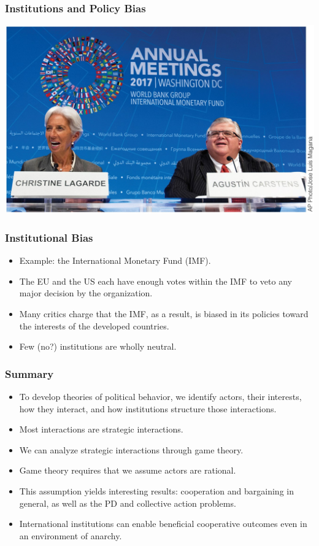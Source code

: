 \documentclass[handout]{beamer}
\begin{document}
\begin{frame} 
	\frametitle{\LARGE{Institutions and Policy Bias}}	
	\centering
	\includegraphics[width=\textwidth,height=0.9\textheight,keepaspectratio]{IMF2017.jpg}
\end{frame}

\begin{frame} 
	\frametitle{\LARGE{Institutional Bias}}	

	\begin{itemize}
		\item Example: the International Monetary Fund (IMF).
		\item The EU and the US each have enough votes within the IMF to veto any major decision by the organization. \pause
		\item Many critics charge that the IMF, as a result, is biased in its policies toward the interests of the developed countries. \pause
		\item Few (no?) institutions are wholly neutral.
	\end{itemize}

\end{frame}

\begin{frame} 
\frametitle{\LARGE{Summary}}
    \begin{itemize}
    	\item To develop theories of political behavior, we identify actors, their interests, how they interact, and how institutions structure those interactions. \pause
    	\item Most interactions are strategic interactions. \pause
    	\item We can analyze strategic interactions through game theory. \pause
    	\item Game theory requires that we assume actors are rational. \pause
    	\item This assumption yields interesting results: cooperation and bargaining in general, as well as the PD and collective action problems. \pause
    	\item International institutions can enable beneficial cooperative outcomes even in an environment of anarchy.         
    \end{itemize}
\end{frame}
\end{document}
